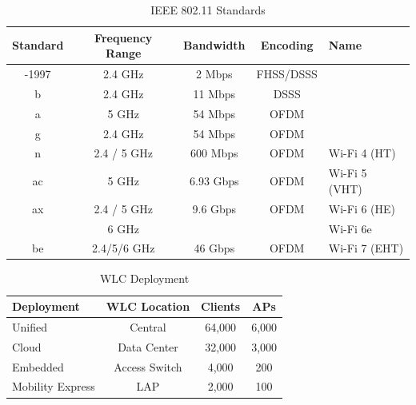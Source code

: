 \documentclass[12pt]{article}
\begin{document}
	\begin{table}[H]
	\centering
	\caption{IEEE 802.11 Standards \label{tab:802.11 STANDARDS}}
	\begin{tabular}{ccccl}
	\hline
	\textbf{Standard}	& \textbf{Frequency Range}	& \textbf{Bandwidth}	& \textbf{Encoding}	& \textbf{Name}\\\hline
	-1997			& 2.4 GHz				& 2 Mbps			& FHSS/DSSS\\\hline
	b 			& 2.4 GHz 				& 11 Mbps			& DSSS\\\hline
	a 			& 5 GHz				& 54 Mbps 			& OFDM\\\hline
	g 			& 2.4 GHz				& 54 Mbps 			& OFDM\\\hline
	n 			& 2.4 / 5 GHz			& 600 Mbps		& OFDM 			& Wi-Fi 4 (HT)\\\hline
	ac 			& 5 GHz				& 6.93 Gbps		& OFDM			& Wi-Fi 5 (VHT)\\\hline
	ax			& 2.4 / 5 GHz			& 9.6 Gbps			& OFDM			& Wi-Fi 6 (HE)\\
				& 6 GHz				&				& 				& Wi-Fi 6e\\\hline
	be 			& 2.4/5/6 GHz			& 46 Gbps			& OFDM			& Wi-Fi 7 (EHT)\\\hline
	\end{tabular}\end{table}

	\begin{table}[H]
	\centering
	\caption{WLC Deployment \label{tab:WLC DEPLOYMENT}}
	\begin{tabular}{lccc}
	\hline
	\textbf{Deployment}	& \textbf{WLC Location}	& \textbf{Clients}		& \textbf{APs}\\\hline
	Unified			& Central				& 64,000			& 6,000\\\hline
	Cloud			& Data Center 			& 32,000			& 3,000\\\hline
	Embedded			& Access Switch			& 4,000 			& 200\\\hline
	Mobility Express		& LAP 				& 2,000			& 100\\\hline
	\end{tabular}\end{table}
\end{document}
